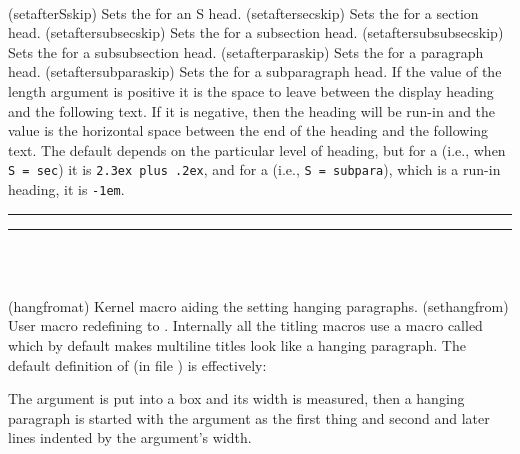 \begin{syntax}
\cmd{\setafterSskip} \\
\end{syntax}
\glossary(setafterSskip)%
  {}%
  {Sets the  for an S head.}
\glossary(setaftersecskip)%
  {}%
  {Sets the  for a section head.}
\glossary(setaftersubsecskip)%
  {}%
  {Sets the  for a subsection head.}
\glossary(setaftersubsubsecskip)%
  {}%
  {Sets the  for a subsubsection head.}
\glossary(setafterparaskip)%
  {}%
  {Sets the  for a paragraph head.}
\glossary(setaftersubparaskip)%
  {}%
  {Sets the  for a subparagraph head.}
If the value of the  length argument is positive it is the space
to leave between the display heading and the following text. If it is negative,
then the heading will be run-in and the value is the horizontal space
between the end of the heading and the following text.
The default  depends on the
particular level of heading, but for a \cmd{\section} (i.e., when
\verb?S = sec?) it is \verb?2.3ex plus .2ex?,
and for a \cmd{\subparagraph} (i.e., \verb?S = subpara?), which is a run-in
heading, it is \verb?-1em?.

\fancybreak{$*$}
\fancybreak{}

\begin{syntax}
\cmd{\@hangfrom} \\
\cmd{\sethangfrom} \\
\end{syntax}
\glossary(hangfromat)%
  {}%
  {Kernel macro aiding the setting hanging paragraphs.}
\glossary(sethangfrom)%
  {}%
  {User macro redefining  to .}
Internally all the titling macros use a macro called \cmd{\@hangfrom} which
by default makes multiline titles look like a hanging paragraph. The
default definition of \cmd{\@hangfrom} (in file ) is
effectively:
\begin{lcode}
\newcommand{\@hangfrom}[1]{\setbox\@tempboxa\hbox{{#1}}%
  \hangindent \wd\@tempboxa\noindent\box\@tempboxa}
\end{lcode}
The argument is put into a box and its width is measured, then a hanging
paragraph is started with the argument as the
first thing and second and later lines indented by the argument's width.

